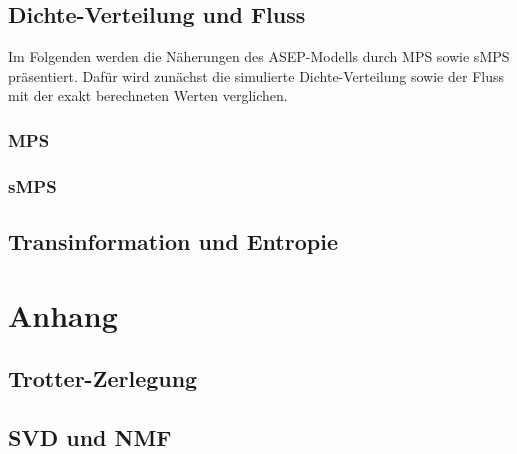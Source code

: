 \documentclass[10pt,a4paper]{report}
\begin{document}
\section{Dichte-Verteilung und Fluss}
Im Folgenden werden die Näherungen des ASEP-Modells durch MPS sowie sMPS präsentiert. Dafür wird zunächst die simulierte Dichte-Verteilung sowie der Fluss mit der exakt berechneten Werten verglichen. 


\subsection{MPS}

\subsection{sMPS}

\section{Transinformation und Entropie}

\chapter{Anhang}
\section{Trotter-Zerlegung}

\section{SVD und NMF}


 

\end{document}

